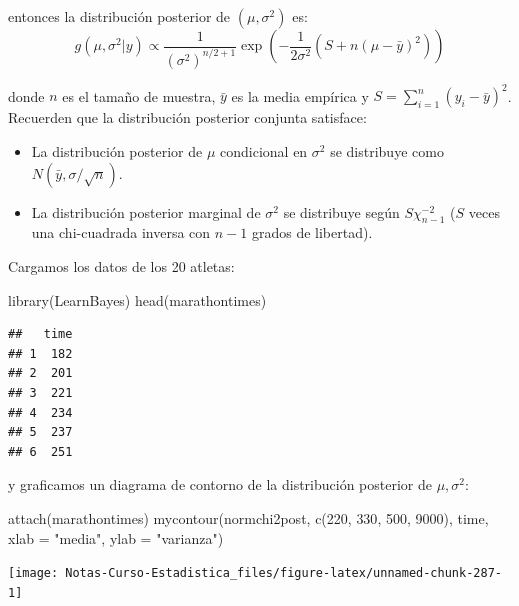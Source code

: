 \documentclass[
  12pt,
]{book}
\newenvironment{Shaded}{\begin{snugshade}}{\end{snugshade}}
\newcommand{\AttributeTok}[1]{\textcolor[rgb]{0.77,0.63,0.00}{#1}}
\newcommand{\DecValTok}[1]{\textcolor[rgb]{0.00,0.00,0.81}{#1}}
\newcommand{\FunctionTok}[1]{\textcolor[rgb]{0.00,0.00,0.00}{#1}}
\newcommand{\NormalTok}[1]{#1}
\newcommand{\StringTok}[1]{\textcolor[rgb]{0.31,0.60,0.02}{#1}}
\providecommand{\tightlist}{%
  \setlength{\itemsep}{0pt}\setlength{\parskip}{0pt}}
\begin{document}
entonces la distribución posterior de \((\mu,\sigma^2)\) es:
\[g(\mu,\sigma^2|y)\propto \frac{1}{(\sigma^2)^{n/2+1}}\exp{\left(-\frac{1}{2\sigma^2}\left(S+n(\mu-\bar y)^2\right)\right)}\]

donde \(n\) es el tamaño de muestra, \(\bar y\) es la media empírica y
\(S=\sum_{i=1}^n(y_i-\bar y)^2\). Recuerden que la distribución
posterior conjunta satisface:

\begin{itemize}
\tightlist
\item
  La distribución posterior de \(\mu\) condicional en \(\sigma^2\) se
  distribuye como \(N(\bar y,\sigma/\sqrt{n})\).
\item
  La distribución posterior marginal de \(\sigma^2\) se distribuye según
  \(S\chi_{n-1}^{-2}\) (\(S\) veces una chi-cuadrada inversa con \(n-1\)
  grados de libertad).
\end{itemize}

Cargamos los datos de los 20 atletas:

\begin{Shaded}
\begin{Highlighting}[]
\FunctionTok{library}\NormalTok{(LearnBayes)}
\FunctionTok{head}\NormalTok{(marathontimes)}
\end{Highlighting}
\end{Shaded}

\begin{verbatim}
##   time
## 1  182
## 2  201
## 3  221
## 4  234
## 5  237
## 6  251
\end{verbatim}

y graficamos un diagrama de contorno de la distribución posterior de
\(\mu,\sigma^2\):

\begin{Shaded}
\begin{Highlighting}[]
\FunctionTok{attach}\NormalTok{(marathontimes)}
\FunctionTok{mycontour}\NormalTok{(normchi2post, }\FunctionTok{c}\NormalTok{(}\DecValTok{220}\NormalTok{, }\DecValTok{330}\NormalTok{, }\DecValTok{500}\NormalTok{, }\DecValTok{9000}\NormalTok{), time,}
    \AttributeTok{xlab =} \StringTok{"media"}\NormalTok{, }\AttributeTok{ylab =} \StringTok{"varianza"}\NormalTok{)}
\end{Highlighting}
\end{Shaded}

\begin{center}\texttt{[image: Notas-Curso-Estadistica\_files/figure-latex/unnamed-chunk-287-1]} \end{center}
\end{document}
